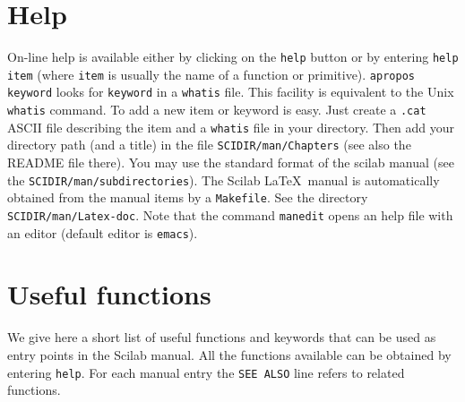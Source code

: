 \section{Help}
On-line help is available either by clicking on the 
{\tt help}
button or by entering {\tt help item} (where {\tt item} is usually the 
name of a function or primitive). {\tt apropos
keyword} looks 
for {\tt keyword} in a {\tt whatis} file. This facility is equivalent 
to the Unix 
{\tt whatis} command. To add a new item or keyword is easy.
Just create a {\tt .cat} ASCII file describing the item and a 
{\tt whatis} file in your directory. Then add your directory path
(and a title) in the file {\tt SCIDIR/man/Chapters} (see also the README file
there). You may use the standard format of the scilab manual
(see the {\tt SCIDIR/man/subdirectories}).
The Scilab \LaTeX\   manual is automatically obtained from the
manual items by a {\tt Makefile}. 
See the directory {\tt SCIDIR/man/Latex-doc}. Note that the command
{\tt manedit} opens an help file with an editor (default editor
is {\tt emacs}).

\section{Useful functions}

We give here a short list of useful functions and keywords that can be used
as entry points in the Scilab manual. All the functions available 
can be obtained by entering {\tt help}. For each manual entry the
{\tt SEE ALSO} line refers to related functions.

